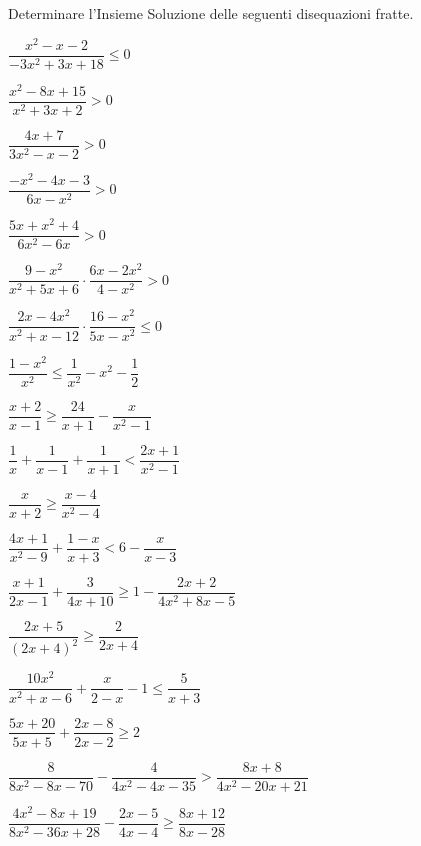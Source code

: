 \begin{esercizio}[*]
\label{ese:4.64}
Determinare l'Insieme Soluzione delle seguenti disequazioni fratte.
\begin{enumeratea}
\item \(\dfrac{x^2-x-2}{-3x^2+3x+18} \leqslant 0\) 
\item \(\dfrac{x^2-8x+15}{x^2+3x+2}>0\) 
\item \(\dfrac{4x+7}{3x^2-x-2}>0\) 
\item \(\dfrac{-x^2-4x-3}{6x-x^2}>0\) 
\item \(\dfrac{5x+x^2+4}{6x^2-6x}>0\) 
\item \(\dfrac{9-x^2}{x^2+5x+6}\cdot \dfrac{6x-2x^2}{4-x^2}>0\) 
\item \(\dfrac{2x-4x^2}{x^2+x-12}\cdot \dfrac{16-x^2}{5x-x^2} \leqslant 0\) 
\item \(\dfrac{1-x^2}{x^2} \leqslant \dfrac 1{x^2}-x^2-\dfrac 1 2\) 
\item \(\dfrac{x+2}{x-1} \geqslant \dfrac{24}{x+1}-\dfrac x{x^2-1}\) 
\item \(\dfrac 1 x+\dfrac 1{x-1}+\dfrac 1{x+1}<\dfrac{2x+1}{x^2-1}\) 
\item \(\dfrac x{x+2} \geqslant \dfrac{x-4}{x^2-4}\) 
\item \(\dfrac{4x+1}{x^2-9}+\dfrac{1-x}{x+3}<6-\dfrac x{x-3}\) 
\item \(\dfrac{x+1}{2x-1}+\dfrac 3{4x+10} \geqslant 1-\dfrac{2x+2}{4x^2+8x-5}\) 
\item \(\dfrac{2x+5}{(2x+4)^2} \geqslant \dfrac 2{2x+4}\) 
\item \(\dfrac{10x^2}{x^2+x-6}+\dfrac x{2-x}-1 \leqslant \dfrac 5{x+3}\) 
\item \(\dfrac{5x+20}{5x+5}+\dfrac{2x-8}{2x-2} \geqslant 2\) 
\item \(\dfrac 8{8x^2-8x-70}-\dfrac 4{4x^2-4x-35}>\dfrac{8x+8}{4x^2-20x+21}\)
\item \(\dfrac{4x^2-8x+19}{8x^2-36x+28}-\dfrac{2x-5}{4x-4} \geqslant 
\dfrac{8x+12}{8x-28}\)
\end{enumeratea}
\end{esercizio}

